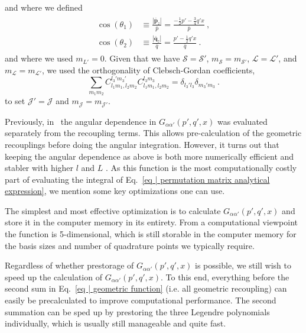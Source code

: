 \documentclass[aps,prc,showpacs,twocolumn,floatfix,nobibnotes,nofootinbib,amsmath,amssymb,longbibliography]{revtex4-2}
\begin{document}
and where we defined
\begin{align}
	\begin{split}
	\cos(\theta_1) &\equiv \frac{|\bar{\bm{p}}_z|}{\bar{p}} = \frac{-\frac{1}{2}p' - \frac{3}{4}q'x}{\bar{p}} \:,\\
	\cos(\theta_2) &\equiv \frac{|\bar{\bm{q}}_z|}{\bar{q}} = \frac{p' - \frac{1}{2}q'x}{\bar{q}} \:.
	\end{split}
\end{align}
and where we used $m_{L'}=0$. Given that we have $\mathcal{S}=\mathcal{S}'$, $m_{\mathcal{S}}=m_{\mathcal{S}'}$, $\mathcal{L}=\mathcal{L}'$, and $m_{\mathcal{L}}=m_{\mathcal{L}'}$, we used the orthogonality of Clebsch-Gordan coefficients,
\begin{equation}
	\sum_{m_1m_2} C_{l_1m_1,l_2m_2}^{l_3'm_3'}C_{l_1m_1,l_2m_2}^{l_3m_3} = \delta_{l_3'l_3}\delta_{m_3'm_3}\:.
\end{equation}
to set $\mathcal{J}'=\mathcal{J}$ and $m_{\mathcal{J}}=m_{\mathcal{J}'}$.

Previously, in~\cite{glockle1983quantum} the angular dependence in
$G_{\alpha\alpha'}(p',q',x)$ was evaluated separately from the
recoupling terms. This allows pre-calculation of the geometric
recouplings before doing the angular integration. However, it turns
out that keeping the angular dependence as above is both more
numerically efficient and stabler with higher $l$ and $L$
\cite{Hebeler:2020ocj}. As this function is the most computationally
costly part of evaluating the integral of Eq.~\eqref{eq | permutation matrix analytical expression},
we mention some key optimizations one can use.

The simplest and most effective optimization is to calculate $G_{\alpha\alpha'}(p',q',x)$ and store it in the computer memory in its entirety. From a computational viewpoint the function is 5-dimensional, which is still storable in the computer memory for the basis sizes and number of quadrature points we typically require.

Regardless of whether prestorage of $G_{\alpha\alpha'}(p',q',x)$ is possible,
we still wish to speed up the calculation of $G_{\alpha\alpha'}(p',q',x)$.
To this end, everything before the second sum in
Eq.~\eqref{eq | geometric function} (i.e. all geometric recoupling)
can easily be precalculated to improve computational performance.
The second summation can be sped up by prestoring the three Legendre polynomials individually,
which is usually still manageable and quite fast.
\end{document}
